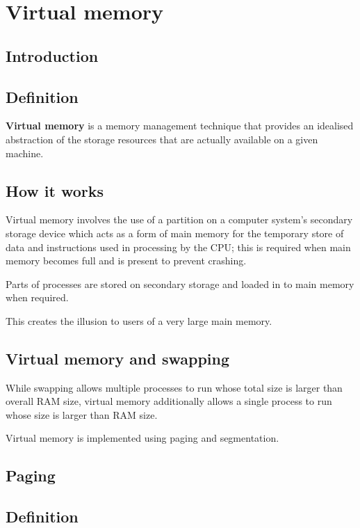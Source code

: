 \documentclass[a4paper]{systems-software}
\begin{document}
\chapter{Virtual memory}

\section{Introduction}

\section*{Definition}

\textbf{Virtual memory} is a memory management technique that provides an idealised abstraction of the storage resources that are actually available on a given machine.


\section*{How it works}

Virtual memory involves the use of a partition on a computer system’s secondary storage device which acts as a form of main memory for the temporary store of data and instructions used in processing by the CPU; this is required when main memory becomes full and is present to prevent crashing.

Parts of processes are stored on secondary storage and loaded in to main memory when required.

This creates the illusion to users of a very large main memory.


\section*{Virtual memory and swapping}

While swapping allows multiple processes to run whose total size is larger than overall RAM size, virtual memory additionally allows a single process to run whose size is larger than RAM size.

Virtual memory is implemented using paging and segmentation.


\section{Paging}

\section*{Definition}
\end{document}
